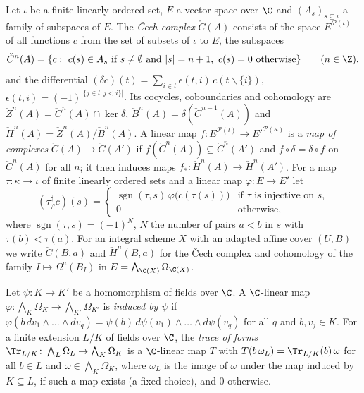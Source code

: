 \begin{definition}\label{pf:hlf-cech:def:cech}
Let $\iota$ be a finite linearly ordered set, $E$ a vector space over $\C$ and $(A_s)_{s\subseteq\iota}$ a family of subspaces of $E$. The
\emph{\v{C}ech complex} $\check C(A)$ consists of the space $E^{\mathcal P(\iota)}$ of all functions $c$ from the set of subsets of $\iota$
to $E$, the subspaces
\[
  \check C^n(A)=\{c:\ c(s)\in A_s\text{ if }s\ne\emptyset\text{ and }|s|=n+1,\ c(s)=0\text{ otherwise}\}\qquad(n\in\Z),
\]
and the differential $(\delta c)(t)=\sum_{i\in t}\epsilon(t,i)\,c(t\smallsetminus\{i\})$, $\epsilon(t,i)=(-1)^{|\{j\in t:j<i\}|}$. Its cocycles,
coboundaries and cohomology are $\check Z^n(A)=\check C^n(A)\cap\ker\delta$, $\check B^n(A)=\delta(\check C^{n-1}(A))$ and
$\check H^n(A)=\check Z^n(A)/\check B^n(A)$. A linear map $f\colon E^{\mathcal P(\iota)}\to E'^{\mathcal P(\kappa)}$ is a \emph{map of complexes}
$\check C(A)\to\check C(A')$ if $f(\check C^n(A))\subseteq\check C^n(A')$ and $f\circ\delta=\delta\circ f$ on $\check C^n(A)$ for all $n$; it
then induces maps $f_*\colon\check H^n(A)\to\check H^n(A')$. For a map $\tau\colon\kappa\to\iota$ of finite linearly ordered sets and a linear
map $\varphi\colon E\to E'$ let
\[
  (\tau^\sharp_\varphi c)(s)=\begin{cases}\operatorname{sgn}(\tau,s)\,\varphi\bigl(c(\tau(s))\bigr)&\text{if $\tau$ is injective on $s$,}\\ 0&\text{otherwise,}\end{cases}
\]
where $\operatorname{sgn}(\tau,s)=(-1)^{N}$, $N$ the number of pairs $a<b$ in $s$ with $\tau(b)<\tau(a)$.
For an integral scheme $X$ with an adapted affine cover $(U,B)$ we write $\check C(B,a)$ and $\check H^n(B,a)$ for the \v{C}ech complex and
cohomology of the family $I\mapsto\Omega^a(B_I)$ in $E=\bigwedge_{\C(X)}\Omega_{\C(X)}$.
\end{definition}

\begin{definition}\label{pf:hlf-cech:def:drmaps}
Let $\psi\colon K\to K'$ be a homomorphism of fields over $\C$. A $\C$-linear map $\varphi\colon\bigwedge_K\Omega_K\to\bigwedge_{K'}\Omega_{K'}$
is \emph{induced by $\psi$} if $\varphi(b\,dv_1\wedge\dots\wedge dv_q)=\psi(b)\,d\psi(v_1)\wedge\dots\wedge d\psi(v_q)$ for all $q$ and
$b,v_j\in K$. For a finite extension $L/K$ of fields over $\C$, the \emph{trace of forms} $\Tr_{L/K}\colon\bigwedge_L\Omega_L\to\bigwedge_K\Omega_K$
is a $\C$-linear map $T$ with $T(b\,\omega_L)=\Tr_{L/K}(b)\,\omega$ for all $b\in L$ and $\omega\in\bigwedge_K\Omega_K$, where $\omega_L$ is the image of $\omega$
under the map induced by $K\subseteq L$, if such a map exists (a fixed choice), and $0$ otherwise.
\end{definition}

